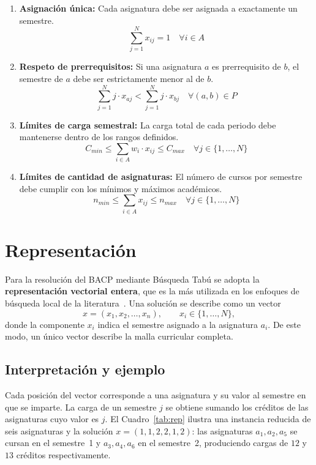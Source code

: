 \documentclass[letter, 10pt]{article}
\begin{document}
\begin{enumerate}
    \item \textbf{Asignaci\'{o}n \'unica:} Cada asignatura debe ser asignada a exactamente un semestre.
    $$\sum_{j=1}^{N} x_{ij} = 1 \quad \forall i \in A$$
    
    \item \textbf{Respeto de prerrequisitos:} Si una asignatura $a$ es prerrequisito de $b$, el semestre de $a$ debe ser estrictamente menor al de $b$.
    $$\sum_{j=1}^{N} j \cdot x_{aj} < \sum_{j=1}^{N} j \cdot x_{bj} \quad \forall (a, b) \in P$$
    
    \item \textbf{L\'{i}mites de carga semestral:} La carga total de cada periodo debe mantenerse dentro de los rangos definidos.
    $$C_{min} \leq \sum_{i \in A} w_i \cdot x_{ij} \leq C_{max} \quad \forall j \in \{1, \dots, N\}$$
    
    \item \textbf{L\'{i}mites de cantidad de asignaturas:} El n\'umero de cursos por semestre debe cumplir con los m\'{i}nimos y m\'{a}ximos acad\'{e}micos.
    $$n_{min} \leq \sum_{i \in A} x_{ij} \leq n_{max} \quad \forall j \in \{1, \dots, N\}$$
\end{enumerate}

\section{Representaci\'on}
Para la resoluci\'on del BACP mediante B\'usqueda Tab\'u se adopta la \textbf{representaci\'on vectorial entera}, que es la m\'as utilizada en los enfoques de b\'usqueda local de la literatura~\cite{Chiarandini2012}. Una soluci\'on se describe como un vector
$$x = (x_1, x_2, \dots, x_n), \qquad x_i \in \{1, \dots, N\},$$
donde la componente $x_i$ indica el semestre asignado a la asignatura $a_i$. De este modo, un \'unico vector describe la malla curricular completa.

\subsection{Interpretaci\'on y ejemplo}
Cada posici\'on del vector corresponde a una asignatura y su valor al semestre en que se imparte. La carga de un semestre $j$ se obtiene sumando los cr\'editos de las asignaturas cuyo valor es $j$. El Cuadro~\ref{tab:rep} ilustra una instancia reducida de seis asignaturas y la soluci\'on $x = (1,1,2,2,1,2)$: las asignaturas $a_1,a_2,a_5$ se cursan en el semestre~1 y $a_3,a_4,a_6$ en el semestre~2, produciendo cargas de $12$ y $13$ cr\'editos respectivamente.
\end{document}
